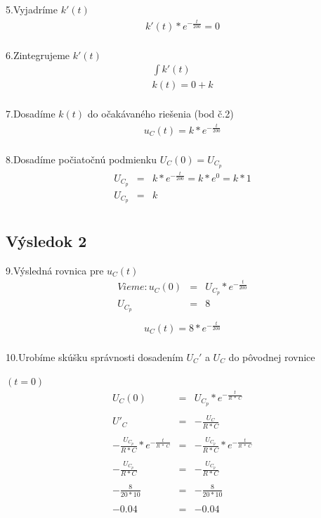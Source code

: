 \documentclass[a4paper,oneside,12pt]{article}
\begin{document}
5.Vyjadríme $k'(t)$
\begin{eqnarray*}
	k'(t) * e^{-\frac{t}{200}} = 0 \\
\end{eqnarray*}

6.Zintegrujeme $k'(t)$
\begin{eqnarray*}
	\int k'(t) \\
	k(t) = 0 + k \\
\end{eqnarray*}

7.Dosadíme $k(t)$ do očakávaného riešenia (bod č.2)
\begin{eqnarray*}
	u_{C}(t) = k * e^{-\frac{t}{200}} \\
\end{eqnarray*}

8.Dosadíme počiatočnú podmienku $U_{C}(0) = U_{C_{p}}$
\begin{eqnarray*}
	U_{C_{p}} &= &k * e^{-\frac{t}{200}} = k * e^0 = k * 1 \\
	U_{C_{p}} &= &k \\
\end{eqnarray*}

\maketitle
\subsection{Výsledok 2}

9.Výsledná rovnica pre $u_{C}(t)$
\begin{eqnarray*}
	Vieme : u_{C}(0) &= & U_{C_{p}} * e^{-\frac{t}{200}} \\
	U_{C_{p}} &= & 8 \\
\end{eqnarray*}
\begin{eqnarray*}
	u_{C}(t) = 8 * e^{-\frac{t}{200}} \\
\end{eqnarray*}

10.Urobíme skúšku správnosti dosadením $U_{C}'$ a $U_{C}$ do pôvodnej rovnice 

$(t = 0)$
\begin{eqnarray*}
	U_{C}(0) &= &U_{C_{p}} * e^{-\frac{t}{R \ * \ C}} \\ \\
	U'_{C} &= &-\frac{U_{C}}{R*C} \\ \\
	-\frac{U_{C_{p}}}{R*C} *  e^{-\frac{t}{R \ * \ C}} &= &-\frac{U_{C_{p}}}{R*C} *  e^{-\frac{t}{R \ * \ C}} \\ \\
	-\frac{U_{C_{p}}}{R*C} &= &-\frac{U_{C_{p}}}{R*C} \\ \\
	-\frac{8}{20 * 10} &= &-\frac{8}{20 * 10} \\ \\
	-0.04 &= & -0.04 \\
\end{eqnarray*}
\end{document}
